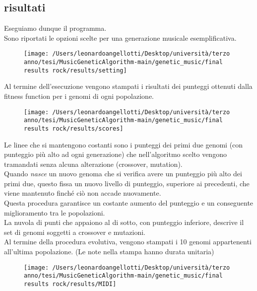 \documentclass[a4paper,12pt]{report}
\begin{document}
\subsection{risultati}

Eseguiamo dunque il programma. \\
Sono riportati le opzioni scelte per una generazione musicale esemplificativa.

\begin{figure}[H]
    \centering
    \texttt{[image: /Users/leonardoangellotti/Desktop/università/terzo anno/tesi/MusicGeneticAlgorithm-main/genetic\_music/final results rock/results/setting]} 
    \label{fig:immagine9}
\end{figure}

Al termine dell'esecuzione vengono stampati i risultati dei punteggi ottenuti dalla fitness function per i genomi di ogni popolazione.

\begin{figure}[H]
    \centering
    \texttt{[image: /Users/leonardoangellotti/Desktop/università/terzo anno/tesi/MusicGeneticAlgorithm-main/genetic\_music/final results rock/results/scores]} 
    \label{fig:immagine10}
\end{figure}

Le linee che si mantengono costanti sono i punteggi dei primi due genomi (con punteggio più alto ad ogni generazione) che nell'algoritmo scelto vengono tramandati senza alcuna alterazione (crossover, mutation). \\
Quando \textit{nasce} un nuovo genoma che si verifica avere un punteggio più alto dei primi due, questo fissa un nuovo livello di punteggio, superiore ai precedenti, che viene mantenuto finché ciò non accade nuovamente. \\
Questa procedura garantisce un costante aumento del punteggio e un conseguente miglioramento tra le popolazioni. \\
La nuvola di punti che appaiono al di sotto, con punteggio inferiore, descrive il set di genomi soggetti a crossover e mutazioni. \\
Al termine della procedura evolutiva, vengono stampati i 10 genomi appartenenti all'ultima popolazione. (Le note nella stampa hanno durata unitaria)

\begin{figure}[H]
    \centering
    \texttt{[image: /Users/leonardoangellotti/Desktop/università/terzo anno/tesi/MusicGeneticAlgorithm-main/genetic\_music/final results rock/results/MIDI]} 
    \label{fig:immagine11}
\end{figure}
\end{document}
